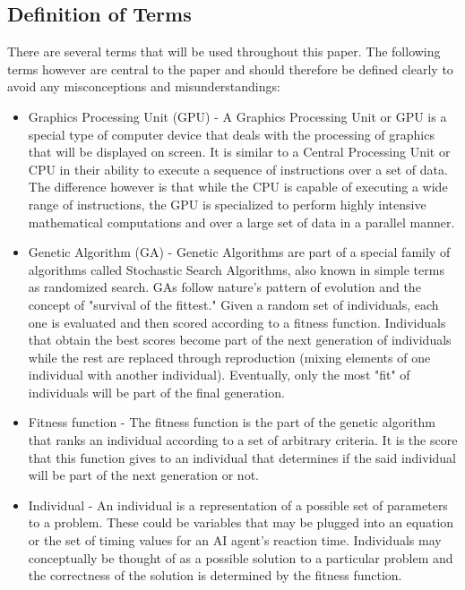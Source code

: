 \documentclass{acm_proc_article-sp}
\begin{document}
\subsection{Definition of Terms}

There are several terms that will be used throughout this paper.
The following terms however are central to the paper and should therefore be defined clearly
to avoid any misconceptions and misunderstandings:

\begin{itemize}
 \item Graphics Processing Unit (GPU) -  A Graphics Processing Unit or GPU is a special type
of computer device that deals with the processing of graphics that will be displayed
on screen. It is similar to a Central Processing Unit or CPU in their ability to execute
a sequence of instructions over a set of data. The difference however is that while the
CPU is capable of executing a wide range of instructions, the GPU is specialized to perform
highly intensive mathematical computations and over a large set of data in a parallel manner.

 \item Genetic Algorithm (GA) - Genetic Algorithms are part of a special family of algorithms
called Stochastic Search Algorithms, also known in simple terms as randomized search. GAs
follow nature's pattern of evolution and the concept of "survival of the fittest." Given
a random set of individuals, each one is evaluated and then scored according to a fitness function.
Individuals that obtain the best scores become part of the next generation of individuals while the
rest are replaced through reproduction (mixing elements of one individual with another individual).
Eventually, only the most "fit" of individuals will be part of the final generation.

 \item Fitness function - The fitness function is the part of the genetic algorithm that ranks
an individual according to a set of arbitrary criteria. It is the score that this function
gives to an individual that determines if the said individual will be part of the next generation
or not.

 \item Individual - An individual is a representation of a possible set of parameters to a problem.
These could be variables that may be plugged into an equation or the set of timing values for an
AI agent's reaction time. Individuals may conceptually be thought of as a possible solution to a
particular problem and the correctness of the solution is determined by the fitness function.


\end{itemize}
\end{document}

